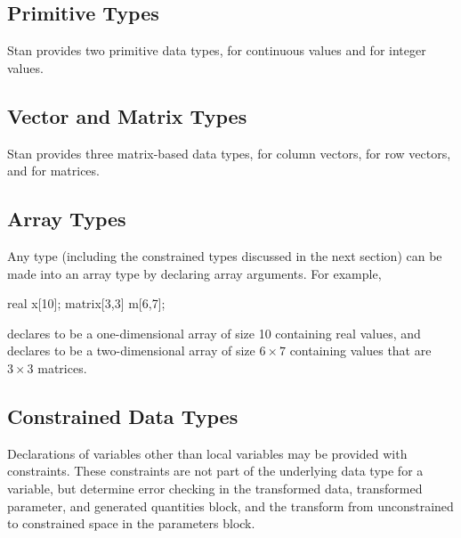 \subsection{Primitive Types}

Stan provides two primitive data types,  for continuous
values and  for integer values.

\subsection{Vector and Matrix Types}
Stan provides three matrix-based data types,  for column
vectors,  for row vectors, and  for
matrices.

\subsection{Array Types}

Any type (including the constrained types discussed in the next
section) can be made into an array type by declaring array arguments.
For example,
%
\begin{stancode}
real x[10];
matrix[3,3] m[6,7];
\end{stancode}
%
declares  to be a one-dimensional array of size 10 containing
real values, and declares  to be a two-dimensional array of
size $6 \times 7$ containing values that are $3 \times 3$ matrices.



\subsection{Constrained Data Types}

Declarations of variables other than local variables may be provided
with constraints.  These constraints are not part of the underlying
data type for a variable, but determine error checking in the
transformed data, transformed parameter, and generated quantities
block, and the transform from unconstrained to constrained space in
the parameters block.

